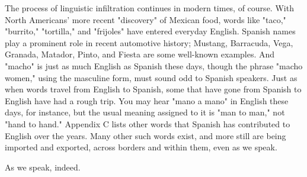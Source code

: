 The process of linguistic infiltration continues in modern
times, of course. With North Americans' more recent "discovery" of
Mexican food, words like "taco," "burrito," "tortilla," and "frijoles"
have entered everyday English. Spanish names play a prominent role in
recent automotive history; Mustang, Barracuda, Vega, Granada, Matador, Pinto, and Fiesta are some well-known examples. And "macho" is
just as much English as Spanish these days, though the phrase "macho
women," using the masculine form, must sound odd to Spanish speakers. Just as when words travel from English to Spanish, some that have
gone from Spanish to English have had a rough trip. You may hear "mano
a mano" in English these days, for instance, but the usual meaning assigned to it is "man to man," not "hand to hand." Appendix C lists
other words that Spanish has contributed to English over the years.
Many other such words exist, and more still are being imported and
exported, across borders and within them, even as we speak.

As we speak, indeed.

